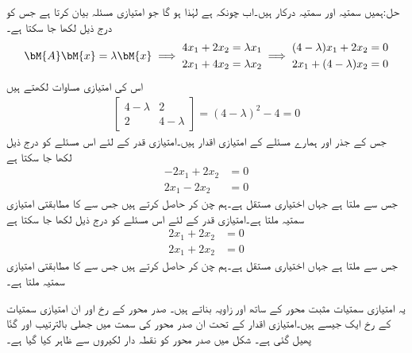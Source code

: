 حل:ہمیں سمتیہ  اور سمتیہ  درکار ہیں۔اب چونکہ  ہے لہٰذا  ہو گا جو امتیازی مسئلہ بیان کرتا ہے جس کو درج ذیل لکھا جا سکتا ہے۔
\begin{gather*}
\bM{A}\bM{x}=\lambda \bM{x} \implies \begin{aligned}4x_1+2x_2&=\lambda x_1\\2x_1+4x_2&=\lambda x_2 \end{aligned}\implies 
\begin{aligned}(4-\lambda)x_1+2x_2&=0\\2x_1+(4-\lambda)x_2&=0 \end{aligned}
\end{gather*}
اس کی امتیازی مساوات لکھتے ہیں
\begin{align*}
\begin{bmatrix} 4-\lambda& 2\\2&4-\lambda \end{bmatrix}=(4-\lambda)^2-4=0
\end{align*}
جس کے جذر  اور  ہمارے مسئلے کے امتیازی اقدار ہیں۔امتیازی قدر  کے لئے اس مسئلے کو درج ذیل لکھا جا سکتا ہے
\begin{align*}
-2x_1+2x_2&=0\\2x_1-2x_2&=0
\end{align*}
جس سے  ملتا ہے جہاں  اختیاری مستقل ہے۔ہم  چن کر  حاصل کرتے ہیں جس سے   کا مطابقتی امتیازی سمتیہ  ملتا ہے۔امتیازی قدر  کے لئے اس مسئلے کو درج ذیل لکھا جا سکتا ہے
\begin{align*}
2x_1+2x_2&=0\\2x_1+2x_2&=0
\end{align*}
جس سے  ملتا ہے جہاں  اختیاری مستقل ہے۔ہم  چن کر  حاصل کرتے ہیں جس سے   کا مطابقتی امتیازی سمتیہ  ملتا ہے۔

یہ امتیازی سمتیات مثبت  محور کے ساتھ  اور  زاویہ بناتے ہیں۔ صدر محور کے رخ اور ان امتیازی سمتیات کے رخ ایک جیسے ہیں۔امتیازی اقدار کے تحت ان صدر محور کی سمت میں جھلی بالترتیب  اور  گنّا پھیل گئی ہے۔ شکل  میں صدر محور کو نقطہ دار لکیروں سے ظاہر کیا گیا ہے۔

